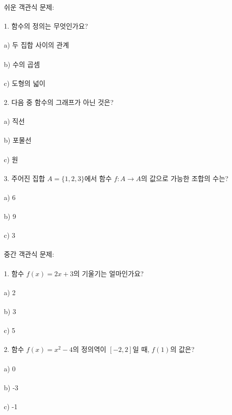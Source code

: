\documentclass[fleqn]{article}
\begin{document}
      
      쉬운 객관식 문제: \\\\  
1. 함수의 정의는 무엇인가요? \\\\  
   a) 두 집합 사이의 관계 \\\\  
   b) 수의 곱셈 \\\\  
   c) 도형의 넓이 \\\\  

2. 다음 중 함수의 그래프가 아닌 것은? \\\\  
   a) 직선 \\\\  
   b) 포물선 \\\\  
   c) 원 \\\\  

3. 주어진 집합 $A = \{1, 2, 3\}$에서 함수 $f : A \to A$의 값으로 가능한 조합의 수는? \\\\  
   a) 6 \\\\  
   b) 9 \\\\  
   c) 3 \\\\  

중간 객관식 문제: \\\\  
1. 함수 $f(x) = 2x + 3$의 기울기는 얼마인가요? \\\\  
   a) 2 \\\\  
   b) 3 \\\\  
   c) 5 \\\\  

2. 함수 $f(x) = x^2 - 4$의 정의역이 $[-2, 2]$일 때, $f(1)$의 값은? \\\\  
   a) 0 \\\\  
   b) -3 \\\\  
   c) -1 \\\\  
\end{document}
